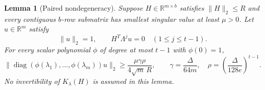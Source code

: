 \documentclass[11pt]{article}
\numberwithin{equation}{section}
\newtheorem{lemma}[theorem]{Lemma}
\theoremstyle{definition}
\newcommand{\R}{\mathbb R}
\newcommand{\diag}{\operatorname{diag}}
\newcommand{\nn}[1]{\lVert #1\rVert}
\begin{document}
\begin{lemma}[Paired nondegeneracy]\label{lem:paired}
Suppose $H\in\R^{m\times b}$ satisfies $\nn H_2\le R$ and every contiguous $b$-row submatrix has smallest singular value at least $\mu>0$. Let
$u\in\R^m$ satisfy
\begin{equation}\label{eq:moments}
\nn u_2=1,\qquad H^T\Lambda^j u=0\quad(1\le j\le t-1).
\end{equation}
For every scalar polynomial $\phi$ of degree at most $t-1$ with $\phi(0)=1$,
\begin{equation}\label{eq:paired}
\nn{\diag(\phi(\lambda_1),\ldots,\phi(\lambda_m))u}_2
\ge\frac{\mu\gamma\rho}{4\sqrt m\,R},
\qquad
\gamma=\frac{\Delta}{64m},\quad
\rho=\left(\frac{\Delta}{128e}\right)^{t-1}.
\end{equation}
No invertibility of $K_\lambda(H)$ is assumed in this lemma.
\end{lemma}
\end{document}
